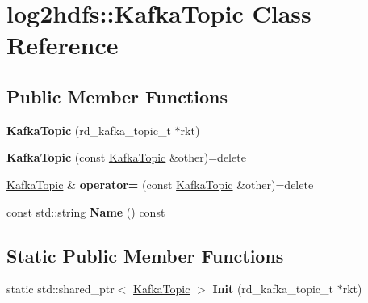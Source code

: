 \hypertarget{classlog2hdfs_1_1KafkaTopic}{}\section{log2hdfs\+:\+:Kafka\+Topic Class Reference}
\label{classlog2hdfs_1_1KafkaTopic}
\subsection*{Public Member Functions}
\begin{DoxyCompactItemize}
\item 
{\bfseries Kafka\+Topic} (rd\+\_\+kafka\+\_\+topic\+\_\+t $\ast$rkt)\hypertarget{classlog2hdfs_1_1KafkaTopic_a25e2026e6b36d5812f1a86bb8c0387ec}{}\label{classlog2hdfs_1_1KafkaTopic_a25e2026e6b36d5812f1a86bb8c0387ec}

\item 
{\bfseries Kafka\+Topic} (const \hyperlink{classlog2hdfs_1_1KafkaTopic}{Kafka\+Topic} \&other)=delete\hypertarget{classlog2hdfs_1_1KafkaTopic_accd71399ae51af91c89f55ee9d5b8843}{}\label{classlog2hdfs_1_1KafkaTopic_accd71399ae51af91c89f55ee9d5b8843}

\item 
\hyperlink{classlog2hdfs_1_1KafkaTopic}{Kafka\+Topic} \& {\bfseries operator=} (const \hyperlink{classlog2hdfs_1_1KafkaTopic}{Kafka\+Topic} \&other)=delete\hypertarget{classlog2hdfs_1_1KafkaTopic_a38865e277a9b548cc2f6e3b68aa5dc02}{}\label{classlog2hdfs_1_1KafkaTopic_a38865e277a9b548cc2f6e3b68aa5dc02}

\item 
const std\+::string {\bfseries Name} () const \hypertarget{classlog2hdfs_1_1KafkaTopic_ad4805746ec5d957c8a7ad11fedcf9a6f}{}\label{classlog2hdfs_1_1KafkaTopic_ad4805746ec5d957c8a7ad11fedcf9a6f}

\end{DoxyCompactItemize}
\subsection*{Static Public Member Functions}
\begin{DoxyCompactItemize}
\item 
static std\+::shared\+\_\+ptr$<$ \hyperlink{classlog2hdfs_1_1KafkaTopic}{Kafka\+Topic} $>$ {\bfseries Init} (rd\+\_\+kafka\+\_\+topic\+\_\+t $\ast$rkt)\hypertarget{classlog2hdfs_1_1KafkaTopic_ad4530a14d7ebbb1f58704c85531668d3}{}\label{classlog2hdfs_1_1KafkaTopic_ad4530a14d7ebbb1f58704c85531668d3}

\end{DoxyCompactItemize}
